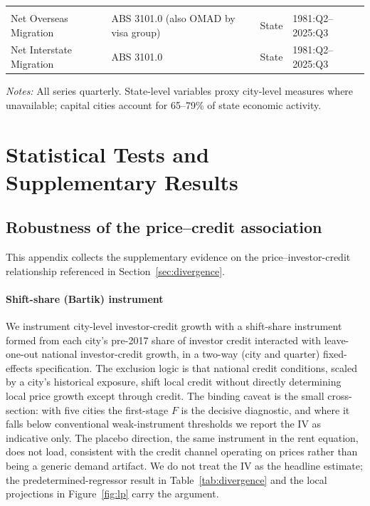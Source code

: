 \documentclass[preprint,11pt,authoryear]{elsarticle}
\begin{document}
\begin{appendices}
\begin{table}[!htbp]
\begin{threeparttable}
\begin{tabular*}{\textwidth}{@{}p{3.8cm}p{5.2cm}p{2.2cm}p{3.0cm}@{}}
\addlinespace
\multicolumn{4}{l}{\textit{Demographic}} \\[3pt]
Net Overseas Migration & ABS 3101.0 (also OMAD by visa group) & State & 1981:Q2--2025:Q3 \\
Net Interstate Migration & ABS 3101.0 & State & 1981:Q2--2025:Q3 \\
\bottomrule
\end{tabular*}
\begin{tablenotes}[flushleft]
\footnotesize
\item \textit{Notes:} All series quarterly. State-level variables
proxy city-level measures where unavailable; capital cities account
for 65--79\% of state economic activity.
\end{tablenotes}
\end{threeparttable}
\end{table}

\FloatBarrier

\section{Statistical Tests and Supplementary Results}

\subsection{Robustness of the price--credit association}
\label{sec:robustness}

This appendix collects the supplementary evidence on the
price--investor-credit relationship referenced in
Section~\ref{sec:divergence}.

\paragraph{Shift-share (Bartik) instrument}
We instrument city-level investor-credit growth with a shift-share
instrument formed from each city's pre-2017 share of investor credit
interacted with leave-one-out national investor-credit growth, in a
two-way (city and quarter) fixed-effects specification. The exclusion
logic is that national credit conditions, scaled by a city's
historical exposure, shift local credit without directly determining
local price growth except through credit. The binding caveat is the
small cross-section: with five cities the first-stage $F$ is the
decisive diagnostic, and where it falls below conventional
weak-instrument thresholds we report the IV as indicative only. The
placebo direction, the same instrument in the rent equation, does
not load, consistent with the credit channel operating on prices
rather than being a generic demand artifact. We do not treat the IV as
the headline estimate; the predetermined-regressor result in
Table~\ref{tab:divergence} and the local projections in
Figure~\ref{fig:lp} carry the argument.


\end{appendices}
\end{document}

